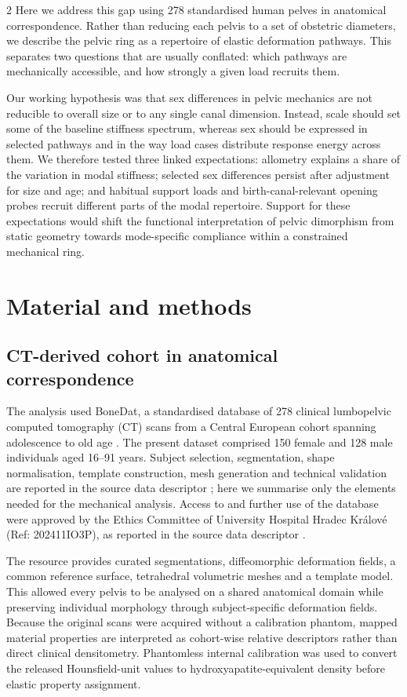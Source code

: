 \documentclass[openacc]{rsproca_new}
\begin{document}
\begin{multicols}{2}
Here we address this gap using 278 standardised human pelves in anatomical correspondence. Rather than reducing each pelvis to a set of obstetric diameters, we describe the pelvic ring as a repertoire of elastic deformation pathways. This separates two questions that are usually conflated: which pathways are mechanically accessible, and how strongly a given load recruits them.

Our working hypothesis was that sex differences in pelvic mechanics are not reducible to overall size or to any single canal dimension. Instead, scale should set some of the baseline stiffness spectrum, whereas sex should be expressed in selected pathways and in the way load cases distribute response energy across them. We therefore tested three linked expectations: allometry explains a share of the variation in modal stiffness; selected sex differences persist after adjustment for size and age; and habitual support loads and birth-canal-relevant opening probes recruit different parts of the modal repertoire. Support for these expectations would shift the functional interpretation of pelvic dimorphism from static geometry towards mode-specific compliance within a constrained mechanical ring.


\section{Material and methods}

\subsection{CT-derived cohort in anatomical correspondence}

The analysis used BoneDat, a standardised database of 278 clinical lumbopelvic computed tomography (CT) scans from a Central European cohort spanning adolescence to old age \cite{HenysKuchar2025}. The present dataset comprised 150 female and 128 male individuals aged 16--91 years. Subject selection, segmentation, shape normalisation, template construction, mesh generation and technical validation are reported in the source data descriptor \cite{HenysKuchar2025}; here we summarise only the elements needed for the mechanical analysis. Access to and further use of the database were approved by the Ethics Committee of University Hospital Hradec Kr\'{a}lov\'{e} (Ref: 202411IO3P), as reported in the source data descriptor \cite{HenysKuchar2025}.

The resource provides curated segmentations, diffeomorphic deformation fields, a common reference surface, tetrahedral volumetric meshes and a template model. This allowed every pelvis to be analysed on a shared anatomical domain while preserving individual morphology through subject-specific deformation fields. Because the original scans were acquired without a calibration phantom, mapped material properties are interpreted as cohort-wise relative descriptors rather than direct clinical densitometry. Phantomless internal calibration was used to convert the released Hounsfield-unit values to hydroxyapatite-equivalent density before elastic property assignment.


\end{multicols}
\end{document}
